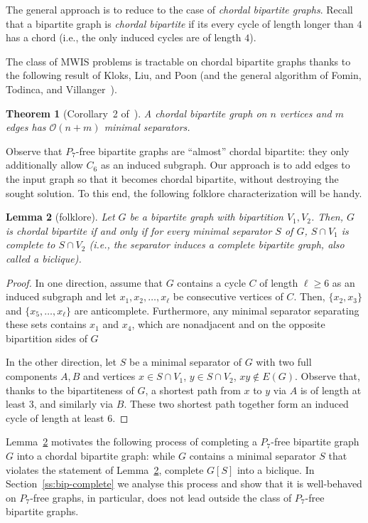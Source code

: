 \documentclass[11pt,a4paper]{article}
\newtheorem{theorem}{Theorem}[section]
\newtheorem{lemma}[theorem]{Lemma}
\theoremstyle{definition}
\newcommand{\Oh}{\mathcal{O}}
\begin{document}
The general approach is to reduce to the case of \emph{chordal bipartite graphs}.
Recall that a bipartite graph is \emph{chordal bipartite} if its every cycle of length
longer than $4$ has a chord (i.e., the only induced cycles are of length $4$). 

The class of \textsc{MWIS} problems is tractable on chordal bipartite graphs
thanks to the following result of Kloks, Liu, and Poon
(and the general algorithm of Fomin, Todinca, and Villanger~\cite{FominTV15}).
\begin{theorem}[Corollary~2 of~\cite{kloks2012feedback}]\label{thm:kloks}
A chordal bipartite graph on $n$ vertices and $m$ edges has $\Oh(n+m)$ minimal separators.
\end{theorem}

Observe that $P_7$-free bipartite graphs are ``almost'' chordal bipartite: 
they only additionally allow $C_6$ as an induced subgraph.
Our approach is to add edges to the input graph so that it becomes chordal bipartite, 
without destroying the sought solution. To this end, the following folklore characterization
will be handy.
\begin{lemma}[folklore]\label{lem:bip-chordal-char}
Let $G$ be a bipartite graph with bipartition $V_1,V_2$.
Then, $G$ is chordal bipartite if and only if for every minimal separator $S$ of $G$,
$S \cap V_1$ is complete to $S \cap V_2$ (i.e., the separator induces a complete bipartite graph, also called a \emph{biclique}).
\end{lemma}
\begin{proof}
    In one direction, assume that $G$ contains a cycle $C$ of length $\ell \geq 6$ as an induced subgraph and let $x_1,x_2,\ldots,x_\ell$ be consecutive vertices of $C$. Then,
    $\{x_2,x_3\}$ and $\{x_5,\ldots,x_\ell\}$ are anticomplete. Furthermore, any
    minimal separator separating these sets contains
    $x_1$ and $x_4$, which are nonadjacent and on the opposite bipartition sides of $G$

    In the other direction, let $S$ be a  minimal separator of $G$ with two full components $A,B$
    and vertices $x \in S \cap V_1$, $y \in S \cap V_2$, $xy \notin E(G)$.
    Observe that, thanks to the bipartiteness of $G$, a shortest path from $x$ to $y$ via $A$
    is of length at least $3$, and similarly via $B$. These two shortest path together form an induced cycle of length at least $6$. 
\end{proof}

Lemma~\ref{lem:bip-chordal-char} motivates the following process of completing
a $P_7$-free bipartite graph $G$ into a chordal bipartite graph: while $G$ contains
a minimal separator $S$ that violates the statement of Lemma~\ref{lem:bip-chordal-char},
complete $G[S]$ into a biclique. 
In Section~\ref{ss:bip-complete} we analyse this process and show that it is well-behaved
on $P_7$-free graphs, in particular, does not lead outside the class of $P_7$-free bipartite graphs.
\end{document}
